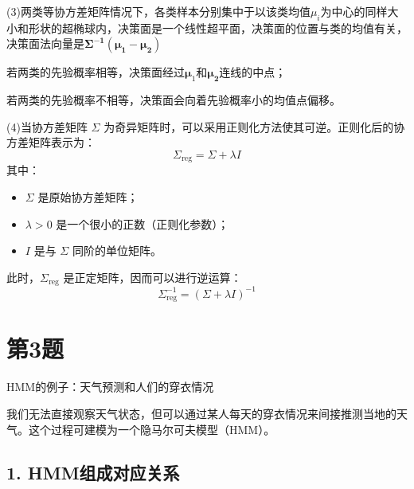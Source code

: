 \documentclass{article}
\begin{document}
(3)两类等协方差矩阵情况下，各类样本分别集中于以该类均值$\mu_i$为中心的同样大小和形状的超椭球内，决策面是一个线性超平面，决策面的位置与类的均值有关，决策面法向量是$\boldsymbol{\Sigma^{-1}(\mu_1-\mu_2)}$

若两类的先验概率相等，决策面经过$\boldsymbol{\mu}_1$和$\boldsymbol{\mu_2}$连线的中点；

若两类的先验概率不相等，决策面会向着先验概率小的均值点偏移。

(4)当协方差矩阵 $\Sigma$ 为奇异矩阵时，可以采用正则化方法使其可逆。正则化后的协方差矩阵表示为：
\[
\Sigma_{\text{reg}} = \Sigma + \lambda I
\]
其中：
\begin{itemize}
  \item $\Sigma$ 是原始协方差矩阵；
  \item $\lambda > 0$ 是一个很小的正数（正则化参数）；
  \item $I$ 是与 $\Sigma$ 同阶的单位矩阵。
\end{itemize}

此时，$\Sigma_{\text{reg}}$ 是正定矩阵，因而可以进行逆运算：
\[
\Sigma_{\text{reg}}^{-1} = (\Sigma + \lambda I)^{-1}
\]

\section*{第3题}
HMM的例子：天气预测和人们的穿衣情况

我们无法直接观察天气状态，但可以通过某人每天的穿衣情况来间接推测当地的天气。这个过程可建模为一个隐马尔可夫模型（HMM）。

\subsection*{1. HMM组成对应关系}
\end{document}
